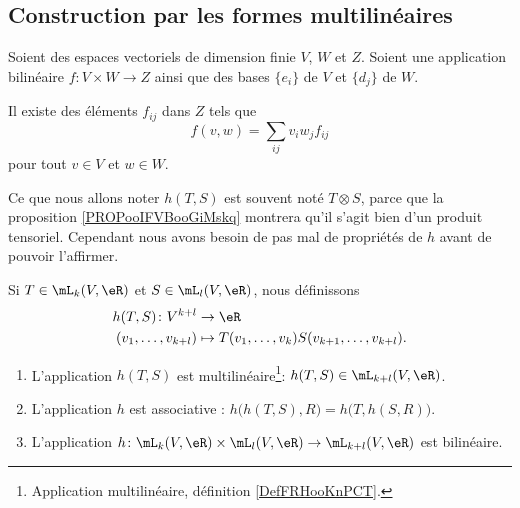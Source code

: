 \subsection{Construction par les formes multilinéaires}

\begin{lemma}		\label{LEMooCXPRooGfJMMV}
	Soient des espaces vectoriels de dimension finie \( V\), \( W\) et \( Z\). Soient une application bilinéaire \(f \colon V\times W\to Z  \) ainsi que des bases \( \{ e_i \}\) de \( V\) et \( \{ d_j \}\) de \( W\).

	Il existe des éléments \( f_{ij}\) dans \( Z\) tels que
	\begin{equation}
		f(v,w)=\sum_{ij}v_iw_jf_{ij}
	\end{equation}
	pour tout \( v\in V\) et \( w\in W\).
\end{lemma}


\begin{normaltext}
	Ce que nous allons noter \( h(T,S)\) est souvent noté \( T\otimes S\), parce que la proposition \ref{PROPooIFVBooGiMskq} montrera qu'il s'agit bien d'un produit tensoriel. Cependant nous avons besoin de pas mal de propriétés de \( h\) avant de pouvoir l'affirmer.
\end{normaltext}

\begin{propositionDef}		\label{DEFooUUMYooOUCzWk}
	Si \( T\in\mL_k(V,\eR)\) et \( S\in\mL_l(V,\eR)\), nous définissons
	\begin{equation}
		\begin{aligned}
			h(T,S)\colon V^{k+l} & \to \eR                                             \\
			(v_1,\ldots,v_{k+l}) & \mapsto T(v_1,\ldots,v_k)S(v_{k+1},\ldots,v_{k+l}).
		\end{aligned}
	\end{equation}
	\begin{enumerate}
		\item
		      L'application \( h(T,S)\) est multilinéaire\footnote{Application multilinéaire, définition \ref{DefFRHooKnPCT}.}: \( h(T,S)\in\mL_{k+l}(V,\eR)\).
		\item
		      L'application \( h\) est associative : \( h\big( h(T,S),R \big)=h\big( T,h(S,R) \big)\).
		\item
		      L'application \(h \colon \mL_k(V,\eR)\times \mL_l(V,\eR)\to \mL_{k+l}(V,\eR)  \) est bilinéaire.
	\end{enumerate}
\end{propositionDef}

